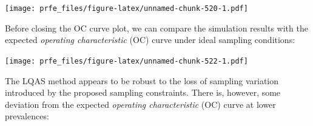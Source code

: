 \documentclass[12pt,a4paper]{book}
\newenvironment{Shaded}{\begin{snugshade}}{\end{snugshade}}
\newcommand{\KeywordTok}[1]{\textcolor[rgb]{0.13,0.29,0.53}{\textbf{#1}}}
\newcommand{\DataTypeTok}[1]{\textcolor[rgb]{0.13,0.29,0.53}{#1}}
\newcommand{\DecValTok}[1]{\textcolor[rgb]{0.00,0.00,0.81}{#1}}
\newcommand{\FloatTok}[1]{\textcolor[rgb]{0.00,0.00,0.81}{#1}}
\newcommand{\StringTok}[1]{\textcolor[rgb]{0.31,0.60,0.02}{#1}}
\newcommand{\OtherTok}[1]{\textcolor[rgb]{0.56,0.35,0.01}{#1}}
\newcommand{\OperatorTok}[1]{\textcolor[rgb]{0.81,0.36,0.00}{\textbf{#1}}}
\newcommand{\NormalTok}[1]{#1}
\theoremstyle{definition}
\theoremstyle{definition}
\theoremstyle{definition}
\theoremstyle{remark}
\begin{document}
\texttt{[image: prfe\_files/figure-latex/unnamed-chunk-520-1.pdf]}

Before closing the OC curve plot, we can compare the simulation results
with the expected \emph{operating characteristic} (OC) curve under ideal
sampling conditions:

\begin{Shaded}
\end{Shaded}

\texttt{[image: prfe\_files/figure-latex/unnamed-chunk-522-1.pdf]}

The LQAS method appears to be robust to the loss of sampling variation
introduced by the proposed sampling constraints. There is, however, some
deviation from the expected \emph{operating characteristic} (OC) curve
at lower prevalences:

\begin{Shaded}
\end{Shaded}
\end{document}
